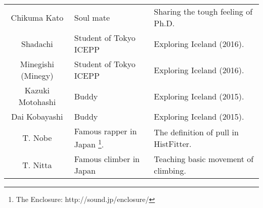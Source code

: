 \begin{table}[h]
\begin{tabularx}{\linewidth}{clX}
    Chikuma Kato       &   Soul mate                                                                      &  Sharing the tough feeling of Ph.D.   \\   
    Shadachi           &   Student of Tokyo ICEPP                                                         &  Exploring Iceland (2016).   \\   
    Minegishi (Minegy) &   Student of Tokyo ICEPP                                                         &  Exploring Iceland (2016).   \\   
    Kazuki Motohashi   &   Buddy                                                                          &  Exploring Iceland (2015).   \\   
    Dai Kobayashi      &   Buddy                                                                          &  Exploring Iceland (2015).   \\   
    T. Nobe            &   Famous rapper in Japan  \footnote{The Enclosure: http://sound.jp/enclosure/}.  &  The definition of pull in HistFitter.   \\   
    T. Nitta           &   Famous climber in Japan                                                        &  Teaching basic movement of climbing.   \\   
    \bottomrule
  \end{tabularx}
\end{table}



